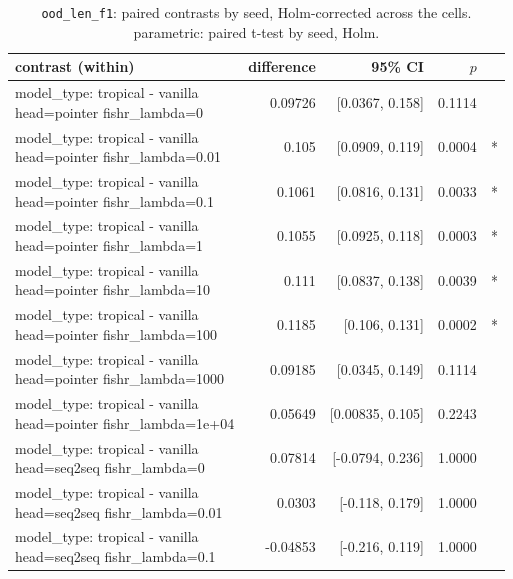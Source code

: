 \documentclass[10pt]{article}
\makeatletter
\newcommand{\stackcell}[1]{\begin{tabular}[t]{@{}l@{}}#1\end{tabular}}
\makeatother
\begin{document}
{\small
\begin{longtable}{lrrrl}
\caption{\texttt{ood\_len\_f1}: paired contrasts by seed, Holm-corrected across the cells. parametric: paired t-test by seed, Holm.}\label{tab:paired-ood_len_f1}\\
\toprule
contrast (within) & difference & 95\% CI & $p$ & \\
\midrule
\endhead
\stackcell{model\_type: tropical - vanilla\\\footnotesize head=pointer fishr\_lambda=0 } & 0.09726 & [0.0367, 0.158] & 0.1114 & \\
\stackcell{model\_type: tropical - vanilla\\\footnotesize head=pointer fishr\_lambda=0.01 } & 0.105 & [0.0909, 0.119] & 0.0004 & *\\
\stackcell{model\_type: tropical - vanilla\\\footnotesize head=pointer fishr\_lambda=0.1 } & 0.1061 & [0.0816, 0.131] & 0.0033 & *\\
\stackcell{model\_type: tropical - vanilla\\\footnotesize head=pointer fishr\_lambda=1 } & 0.1055 & [0.0925, 0.118] & 0.0003 & *\\
\stackcell{model\_type: tropical - vanilla\\\footnotesize head=pointer fishr\_lambda=10 } & 0.111 & [0.0837, 0.138] & 0.0039 & *\\
\stackcell{model\_type: tropical - vanilla\\\footnotesize head=pointer fishr\_lambda=100 } & 0.1185 & [0.106, 0.131] & 0.0002 & *\\
\stackcell{model\_type: tropical - vanilla\\\footnotesize head=pointer fishr\_lambda=1000 } & 0.09185 & [0.0345, 0.149] & 0.1114 & \\
\stackcell{model\_type: tropical - vanilla\\\footnotesize head=pointer fishr\_lambda=1e+04 } & 0.05649 & [0.00835, 0.105] & 0.2243 & \\
\stackcell{model\_type: tropical - vanilla\\\footnotesize head=seq2seq fishr\_lambda=0 } & 0.07814 & [-0.0794, 0.236] & 1.0000 & \\
\stackcell{model\_type: tropical - vanilla\\\footnotesize head=seq2seq fishr\_lambda=0.01 } & 0.0303 & [-0.118, 0.179] & 1.0000 & \\
\stackcell{model\_type: tropical - vanilla\\\footnotesize head=seq2seq fishr\_lambda=0.1 } & -0.04853 & [-0.216, 0.119] & 1.0000 & \\

\end{longtable}}
\end{document}
